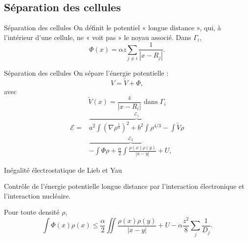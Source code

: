 \documentclass{beamer}
\renewcommand{\leq}{\leqslant}
\begin{document}
\subsection{Séparation des cellules}
\begin{frame}{Séparation des cellules}
    On définit le potentiel « longue distance », qui, à l'intérieur d'une cellule, ne « voit pas
    » le noyau associé. Dans $\Gamma_i$,
    \[\Phi(x) = \alpha z \sum_{j\neq i} \frac{1}{|x-R_j|}.\]
\end{frame}
\newcommand{\vv}{\widetilde{V}}
\newcommand{\vvv}{\widehat{V}}
\begin{frame}{Séparation des cellules}
    On sépare l'énergie potentielle :
    \[V = \vv + \Phi,\]
    avec
    \[\vv(x) = \frac z {|x - R_i|} \text{ dans $\Gamma_i$}\]
    \begin{align*}
    \mathcal{E} =&
    \overbrace{a^2\int (\nabla \rho^\frac{1}{3})^2 + b^2 \int \rho^{4/3}
    - \int \vv \rho}^{\mathcal{E}_1}\\
    &\overbrace{-\int \Phi \rho +  \frac{\alpha}{2}\int\frac{\rho(x) \rho(y)}{|x-y|}+U,}^{\mathcal{E}_2}
    \end{align*}
\end{frame}

\begin{frame}{Inégalité électrostatique de Lieb et Yau}

    Contrôle de l'énergie potentielle longue distance
    par l'interaction électronique et l'interaction nucléaire.

    \vspace{1cm}

    Pour toute densité $\rho$,
    \[\int\Phi(x)\rho(x) \leq \frac{\alpha}{2}\iint
    \frac{\rho(x)\rho(y)}{|x-y|} + U -
    \alpha \frac{z^2}{8}\sum_j \frac{1}{D_j}.\]
\end{frame}
\end{document}
